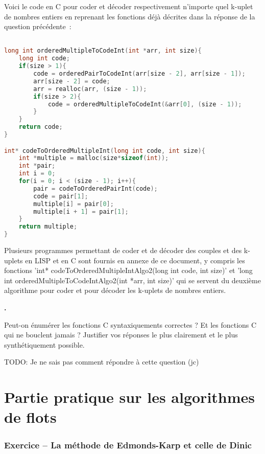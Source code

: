 \documentclass{article}
\newcounter{exocount}
\newcounter{enoncecount}
\newenvironment{enonce}
{
\stepcounter{enoncecount}
\bf\small \arabic{enoncecount}.
\begin{bf}
}
{
\end{bf}
}
\begin{document}
Voici le code en C pour coder et décoder respectivement n'importe quel k-uplet de nombres entiers en reprenant les fonctions déjà décrites dans la réponse de la question précédente~:

\begin{lstlisting}[language=C]

long int orderedMultipleToCodeInt(int *arr, int size){
	long int code;	
	if(size > 1){
		code = orderedPairToCodeInt(arr[size - 2], arr[size - 1]);
		arr[size - 2] = code;
		arr = realloc(arr, (size - 1));
		if(size > 2){		
			code = orderedMultipleToCodeInt(&arr[0], (size - 1));
		}
	}
	return code;
}

int* codeToOrderedMultipleInt(long int code, int size){
	int *multiple = malloc(size*sizeof(int));
	int *pair;
	int i = 0;
	for(i = 0; i < (size - 1); i++){
		pair = codeToOrderedPairInt(code);
		code = pair[1];
		multiple[i] = pair[0];
		multiple[i + 1] = pair[1];
	}
	return multiple;
}

\end{lstlisting}


Plusieurs programmes permettant de coder et de décoder des couples et des k-uplets en LISP et en C sont fournis en annexe de ce document, y compris les fonctions 'int* codeToOrderedMultipleIntAlgo2(long int code, int size)' et 'long int orderedMultipleToCodeIntAlgo2(int *arr, int size)' qui se servent du deuxième algorithme pour coder et pour décoder les k-uplets de nombres entiers.  


\begin{enonce}
  Peut-on énumérer les fonctions C syntaxiquements correctes ? Et les fonctions C qui ne bouclent jamais ? Justifier vos réponses le plus
  clairement et le plus synthétiquement possible.
\end{enonce}

TODO: Je ne sais pas comment répondre à cette question (jc)

\section{Partie pratique sur les algorithmes de flots}

\subsubsection*{Exercice \bf\small {} -- La méthode de Edmonds-Karp et celle de Dinic}
\setcounter{enoncecount}{0}
\end{document}

